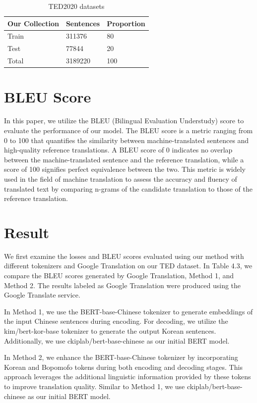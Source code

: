 \documentclass[PhD]{PHlab-thesis}
\begin{document}
\begin{table}
\begin{tabularx}{0.9\linewidth}{p{4cm} p{4cm} p{4cm}}
Our Collection & Sentences & Proportion\\
\toprule
Train & 311376 & 80\\[.3ex]
Test & 77844 & 20 \\[.3ex]
\toprule
Total  & 3189220 & 100\\
\bottomrule
\end{tabularx}
\caption{TED2020 datasets}
\label{tab:notation}
\end{table}


\section{BLEU Score}
In this paper, we utilize the BLEU (Bilingual Evaluation Understudy) score\cite{papineni-etal-2002-bleu} to evaluate the performance of our model. The BLEU score is a metric ranging from 0 to 100 that quantifies the similarity between machine-translated sentences and high-quality reference translations. A BLEU score of 0 indicates no overlap between the machine-translated sentence and the reference translation, while a score of 100 signifies perfect equivalence between the two. This metric is widely used in the field of machine translation to assess the accuracy and fluency of translated text by comparing n-grams of the candidate translation to those of the reference translation.

\section{Result}
We first examine the losses and BLEU scores evaluated using our method with different tokenizers and Google Translation on our TED dataset. In Table 4.3, we compare the BLEU scores generated by Google Translation, Method 1, and Method 2. The results labeled as Google Translation were produced using the Google Translate service.

In Method 1, we use the BERT-base-Chinese tokenizer to generate embeddings of the input Chinese sentences during encoding. For decoding, we utilize the kim/bert-kor-base tokenizer to generate the output Korean sentences. Additionally, we use ckiplab/bert-base-chinese as our initial BERT model.

In Method 2, we enhance the BERT-base-Chinese tokenizer by incorporating Korean and Bopomofo tokens during both encoding and decoding stages. This approach leverages the additional linguistic information provided by these tokens to improve translation quality. Similar to Method 1, we use ckiplab/bert-base-chinese as our initial BERT model.
\end{document}

